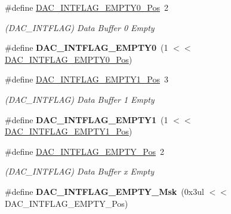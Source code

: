 \begin{DoxyCompactItemize}
\item 
\hypertarget{group___s_a_m_l21___d_a_c_gad32de3852e2d2484e2832be4819d4364}{}\#define \hyperlink{group___s_a_m_l21___d_a_c_gad32de3852e2d2484e2832be4819d4364}{D\+A\+C\+\_\+\+I\+N\+T\+F\+L\+A\+G\+\_\+\+E\+M\+P\+T\+Y0\+\_\+\+Pos}~2\label{group___s_a_m_l21___d_a_c_gad32de3852e2d2484e2832be4819d4364}

\begin{DoxyCompactList}\small\item\em (D\+A\+C\+\_\+\+I\+N\+T\+F\+L\+A\+G) Data Buffer 0 Empty \end{DoxyCompactList}\item 
\hypertarget{group___s_a_m_l21___d_a_c_ga0dea5c850eb6905e594a704f39e96265}{}\#define {\bfseries D\+A\+C\+\_\+\+I\+N\+T\+F\+L\+A\+G\+\_\+\+E\+M\+P\+T\+Y0}~(1 $<$$<$ \hyperlink{group___s_a_m_l21___d_a_c_gad32de3852e2d2484e2832be4819d4364}{D\+A\+C\+\_\+\+I\+N\+T\+F\+L\+A\+G\+\_\+\+E\+M\+P\+T\+Y0\+\_\+\+Pos})\label{group___s_a_m_l21___d_a_c_ga0dea5c850eb6905e594a704f39e96265}

\item 
\hypertarget{group___s_a_m_l21___d_a_c_ga7e3bd4dd4fca96ba8d463b959c91d5dd}{}\#define \hyperlink{group___s_a_m_l21___d_a_c_ga7e3bd4dd4fca96ba8d463b959c91d5dd}{D\+A\+C\+\_\+\+I\+N\+T\+F\+L\+A\+G\+\_\+\+E\+M\+P\+T\+Y1\+\_\+\+Pos}~3\label{group___s_a_m_l21___d_a_c_ga7e3bd4dd4fca96ba8d463b959c91d5dd}

\begin{DoxyCompactList}\small\item\em (D\+A\+C\+\_\+\+I\+N\+T\+F\+L\+A\+G) Data Buffer 1 Empty \end{DoxyCompactList}\item 
\hypertarget{group___s_a_m_l21___d_a_c_ga3366022ba576c500769b03f891d28453}{}\#define {\bfseries D\+A\+C\+\_\+\+I\+N\+T\+F\+L\+A\+G\+\_\+\+E\+M\+P\+T\+Y1}~(1 $<$$<$ \hyperlink{group___s_a_m_l21___d_a_c_ga7e3bd4dd4fca96ba8d463b959c91d5dd}{D\+A\+C\+\_\+\+I\+N\+T\+F\+L\+A\+G\+\_\+\+E\+M\+P\+T\+Y1\+\_\+\+Pos})\label{group___s_a_m_l21___d_a_c_ga3366022ba576c500769b03f891d28453}

\item 
\hypertarget{group___s_a_m_l21___d_a_c_ga0dac29b106d18582f439752a01102763}{}\#define \hyperlink{group___s_a_m_l21___d_a_c_ga0dac29b106d18582f439752a01102763}{D\+A\+C\+\_\+\+I\+N\+T\+F\+L\+A\+G\+\_\+\+E\+M\+P\+T\+Y\+\_\+\+Pos}~2\label{group___s_a_m_l21___d_a_c_ga0dac29b106d18582f439752a01102763}

\begin{DoxyCompactList}\small\item\em (D\+A\+C\+\_\+\+I\+N\+T\+F\+L\+A\+G) Data Buffer x Empty \end{DoxyCompactList}\item 
\hypertarget{group___s_a_m_l21___d_a_c_gaf190df8dfe6ad43d3bb7f0066d295845}{}\#define {\bfseries D\+A\+C\+\_\+\+I\+N\+T\+F\+L\+A\+G\+\_\+\+E\+M\+P\+T\+Y\+\_\+\+Msk}~(0x3ul $<$$<$ D\+A\+C\+\_\+\+I\+N\+T\+F\+L\+A\+G\+\_\+\+E\+M\+P\+T\+Y\+\_\+\+Pos)\label{group___s_a_m_l21___d_a_c_gaf190df8dfe6ad43d3bb7f0066d295845}


\end{DoxyCompactItemize}
